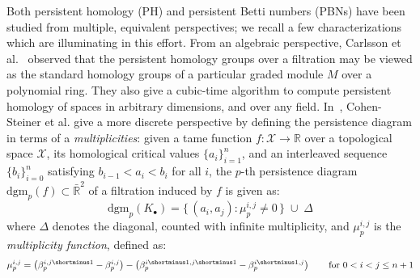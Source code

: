 \newcommand\restr[2]{{%
  \left.\kern-\nulldelimiterspace %
  #1 %
  \vphantom{\big|} %
  \right|_{#2} %
  }}
  

Both persistent homology (PH) and persistent Betti numbers (PBNs) have been studied from multiple, equivalent perspectives; we recall a few characterizations which are illuminating in this effort.
From an algebraic perspective, Carlsson et al.~\cite{zomorodian2004computing} observed that the persistent homology groups over a filtration may be viewed as the standard homology groups of a particular graded module $M$ over a polynomial ring. They also give a cubic-time algorithm to compute persistent homology of spaces in arbitrary dimensions, and over any field. 
In~\cite{cohen2005stability}, Cohen-Steiner et al. give a more discrete perspective by defining the persistence diagram in terms of a \emph{multiplicities}: given a tame function $f: \mathcal{X} \to \mathbb{R}$ over a topological space $\mathcal{X}$, its homological critical values $\{ a_i \}_{i=1}^n$, and an interleaved sequence $\{ b_i \}_{i=0}^n$ satisfying $b_{i-1} < a_i < b_i$ for all $i$, the $p$-th persistence diagram $\mathrm{dgm}_p(f) \subset \bar{\mathbb{R}}^2$ of a filtration induced by $f$ is given as: 
\begin{equation}
\mathrm{dgm}_p(K_\bullet) = \{ \, (a_i, a_j) :  \mu_p^{i,j} \neq 0 \, \} \; \cup \; \Delta	
\end{equation}
where $\Delta$ denotes the diagonal, counted with infinite multiplicity, and $\mu_p^{i,j}$ is the  \emph{multiplicity function}, defined as: 
\begin{equation}\label{eq:multiplicity}
	\mu_p^{i,j} = \left(\beta_p^{i,j\shortminus1} - \beta_p^{i,j} \right) - \left(\beta_p^{i\shortminus1,j\shortminus1} - \beta_p^{i\shortminus1,j} \right) \quad\quad \text{for } 0 < i < j \leq n+ 1
\end{equation}
